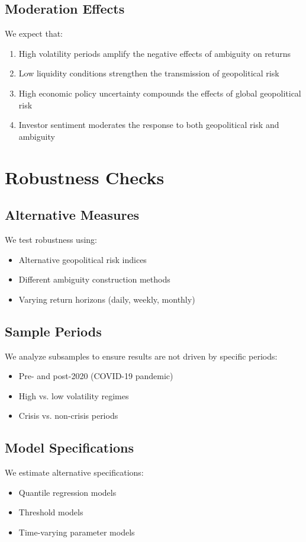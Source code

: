 \documentclass{article}
\begin{document}
\subsection{Moderation Effects}
We expect that:
\begin{enumerate}
\item High volatility periods amplify the negative effects of ambiguity on returns
\item Low liquidity conditions strengthen the transmission of geopolitical risk
\item High economic policy uncertainty compounds the effects of global geopolitical risk
\item Investor sentiment moderates the response to both geopolitical risk and ambiguity
\end{enumerate}

\section{Robustness Checks}

\subsection{Alternative Measures}
We test robustness using:
\begin{itemize}
\item Alternative geopolitical risk indices
\item Different ambiguity construction methods
\item Varying return horizons (daily, weekly, monthly)
\end{itemize}

\subsection{Sample Periods}
We analyze subsamples to ensure results are not driven by specific periods:
\begin{itemize}
\item Pre- and post-2020 (COVID-19 pandemic)
\item High vs. low volatility regimes
\item Crisis vs. non-crisis periods
\end{itemize}

\subsection{Model Specifications}
We estimate alternative specifications:
\begin{itemize}
\item Quantile regression models
\item Threshold models
\item Time-varying parameter models
\end{itemize}
\end{document}
